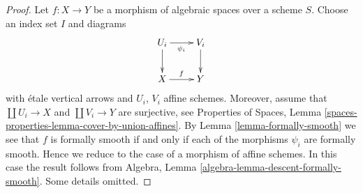 \documentclass[10pt,a4paper]{amsart}
\theoremstyle{plain}
\theoremstyle{definition}
\theoremstyle{remark}
\numberwithin{equation}{subsection}
\begin{document}
\begin{proof}
Let $f : X \to Y$ be a morphism of algebraic spaces over a scheme $S$.
Choose an index set $I$ and diagrams
$$
\xymatrix{
U_i \ar[d] \ar[r]_{\psi_i} & V_i \ar[d] \\
X \ar[r]^f & Y
}
$$
with \'etale vertical arrows and $U_i$, $V_i$ affine schemes. Moreover,
assume that $\coprod U_i \to X$ and $\coprod V_i \to Y$ are surjective, see
Properties of Spaces,
Lemma \ref{spaces-properties-lemma-cover-by-union-affines}.
By
Lemma \ref{lemma-formally-smooth}
we see that $f$ is formally smooth if and only if each of the morphisms
$\psi_i$ are formally smooth. Hence we reduce to the case of a morphism
of affine schemes. In this case the result follows from
Algebra, Lemma \ref{algebra-lemma-descent-formally-smooth}.
Some details omitted.
\end{proof}
\end{document}
